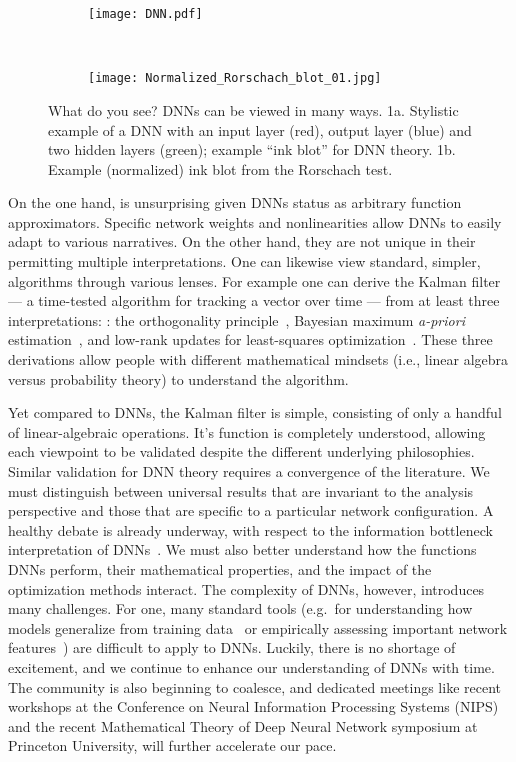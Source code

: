\documentclass[11pt,lettersize]{article}
\begin{document}
\begin{figure*}[h]
\centering
    \begin{subfigure}[t]{0.5\textwidth}
        \centering
        \texttt{[image: DNN.pdf]}
    \end{subfigure}%
    ~ 
    \begin{subfigure}[t]{0.5\textwidth}
        \centering
        \texttt{[image: Normalized\_Rorschach\_blot\_01.jpg]}
    \end{subfigure}
        \caption{What do you see? DNNs can be viewed in many ways. 1a. Stylistic example of a DNN with an input layer (red), output layer (blue) and two hidden layers (green); example ``ink blot'' for DNN theory. 1b. Example (normalized) ink blot from the Rorschach test.}
\end{figure*}

On the one hand, is unsurprising given DNNs status as arbitrary function approximators. Specific network weights and nonlinearities allow DNNs to easily adapt to various narratives. On the other hand, they are not unique in their permitting multiple interpretations. One can likewise view standard, simpler, algorithms through various lenses. For example one can derive the Kalman filter --- a time-tested algorithm for tracking a vector over time --- from at least three interpretations: : the orthogonality principle~\cite{haykin2008adaptive}, Bayesian maximum \emph{a-priori} estimation~\cite{barker1995bayesian,charles2015dynamics}, and low-rank updates for least-squares optimization~\cite{moon2000mathematical}. These three derivations allow people with different mathematical mindsets (i.e., linear algebra versus probability theory) to understand the algorithm.

Yet compared to DNNs, the Kalman filter is simple, consisting of only a handful of linear-algebraic operations. It's function is completely understood, allowing each viewpoint to be validated despite the different underlying philosophies.  
Similar validation for DNN theory requires a convergence of the literature. We must distinguish between universal results that are invariant to the analysis perspective and those that are specific to a particular network configuration. A healthy debate is already underway, with respect to the information bottleneck interpretation of DNNs~\cite{tishby2015deep,saxe2018iclr}. We must also better understand how the functions DNNs perform, their mathematical properties, and the impact of the optimization methods interact. The complexity of DNNs, however, introduces many challenges. For one, many standard tools (e.g.\ for understanding how models generalize from training data~\cite{zhang2016understanding} or empirically assessing important network features~\cite{ghorbani2017interpretation}) are difficult to apply to DNNs.
Luckily, there is no shortage of excitement, and we continue to enhance our understanding of DNNs with time.  
The community is also beginning to coalesce, and dedicated meetings like recent workshops at the Conference on Neural Information Processing Systems (NIPS) and the recent Mathematical Theory of Deep Neural Network symposium at Princeton University, will further accelerate our pace. 
\end{document}
